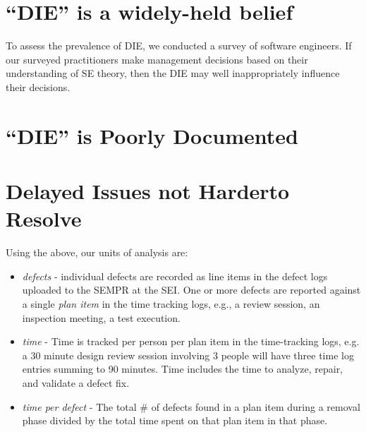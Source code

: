 \documentclass{sig-alternate}
\newcommand{\todo}[1]{\textcolor{Maroon}{TODO: #1}}
\newcommand{\bi}{\begin{itemize}}%
\newcommand{\ei}{\end{itemize}}
\newcommand{\fig}[1]{Figure~\ref{fig:#1}}
\begin{document}
\section{``DIE'' is a  widely-held belief}
To assess the prevalence of DIE,   we conducted a survey of software engineers. If our surveyed practitioners make management decisions based on their
understanding of SE theory, then the DIE  may well inappropriately influence their decisions.



\section{``DIE'' is Poorly  Documented}
 










%
 

\section{Delayed Issues not  Harder\newline to Resolve}





Using the above,
our units of analysis are:
\bi
    \item \emph{defects} - individual defects are recorded as line items in the defect logs uploaded to the SEMPR at the SEI. One or more defects are reported against a single \emph{plan item} in the time tracking logs, e.g., a review session, an inspection meeting, a test execution.
    \item \emph{time} - Time is tracked per person per plan item in the time-tracking logs, e.g. a 30 minute design review session involving 3 people will have three time log entries summing to 90 minutes. Time includes the time to analyze, repair, and validate a defect fix.
    \item \emph{time per defect} - The total \# of defects found in a plan item during a removal phase divided by the total time spent on that plan item in that phase.
\ei


\end{document}
